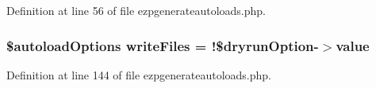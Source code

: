 Definition at line 56 of file ezpgenerateautoloads.\-php.

\hypertarget{ezpgenerateautoloads_8php_a210f8683b204a76199152312e3d9a177}{
\subsubsection[{write\-Files}]{\setlength{\rightskip}{0pt plus 5cm}\$autoload\-Options {\bf write\-Files} = !\$dryrun\-Option-\/$>$value}}\label{ezpgenerateautoloads_8php_a210f8683b204a76199152312e3d9a177}


Definition at line 144 of file ezpgenerateautoloads.\-php.

